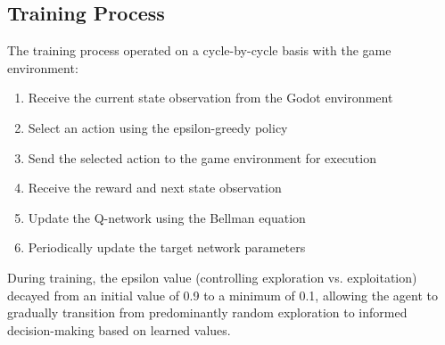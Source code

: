 \subsection{Training Process}

The training process operated on a cycle-by-cycle basis with the game environment:

\begin{enumerate}
    \item Receive the current state observation from the Godot environment
    \item Select an action using the epsilon-greedy policy
    \item Send the selected action to the game environment for execution
    \item Receive the reward and next state observation
    \item Update the Q-network using the Bellman equation
    \item Periodically update the target network parameters
\end{enumerate}

During training, the epsilon value (controlling exploration vs. exploitation) decayed from an initial value of 0.9 to a minimum of 0.1, 
allowing the agent to gradually transition from predominantly random exploration to informed decision-making based on learned values.
